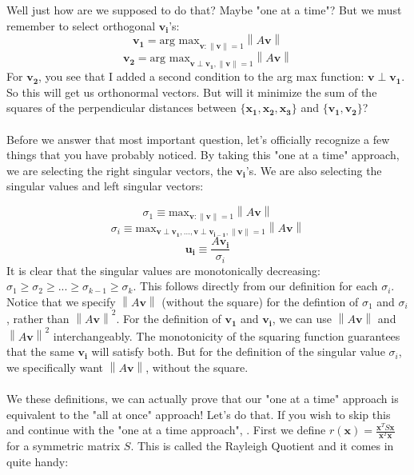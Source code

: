 \documentclass{tufte-handout}
\newcommand{\norm}[1]{\left\lVert#1\right\rVert}
\begin{document}
\noindent Well just how are we supposed to do that? Maybe "one at a time"? But we must remember to select orthogonal $\mathbf{v_i}$'s:
\[
\mathbf{v_1}
=
\text{arg max}_{\mathbf{v}:\norm{\mathbf{v}}=1}\norm{A\mathbf{v}}
\]
\[
\mathbf{v_2}
=
\text{arg max}_{\mathbf{v}\perp\mathbf{v_1},\norm{\mathbf{v}}=1}\norm{A\mathbf{v}}
\]
For $\mathbf{v_2}$, you see that I added a second condition to the arg max function: $\mathbf{v}\perp\mathbf{v_1}$. So this will get us orthonormal vectors. But will it minimize the sum of the squares of the perpendicular distances between $\{\mathbf{x_1},\mathbf{x_2}, \mathbf{x_3}\}$ and $\{\mathbf{v_1}, \mathbf{v_2}\}$?\\\leavevmode\\

\noindent Before we answer that most important question, let's officially recognize a few things that you have probably noticed. By taking this "one at a time" approach, we are selecting the right singular vectors, the $\mathbf{v_i}$'s. We are also selecting the singular values and left singular vectors:

\[
\sigma_{1}\equiv\text{max}_{\mathbf{v}:\norm{\mathbf{v}}=1}\norm{A\mathbf{v}}
\]
\[
\sigma_{i}\equiv\text{max}_{\mathbf{v}\perp\mathbf{v_1},...,\mathbf{v}\perp\mathbf{v_{i-1}},\norm{\mathbf{v}}=1}\norm{A\mathbf{v}}
\]
\[
\mathbf{u_i}\equiv\frac{A\mathbf{v_i}}{\sigma_{i}}
\]
It is clear that the singular values are monotonically decreasing: $\sigma_{1}\geq\sigma_{2}\geq...\geq\sigma_{k-1}\geq\sigma_{k}$. This follows directly from our definition for each $\sigma_{i}$. Notice that we specify $\norm{A\mathbf{v}}$ (without the square) for the defintion of $\sigma_{1}$ and $\sigma_{i}$, rather than $\norm{A\mathbf{v}}^2$. For the definition of $\mathbf{v_1}$ and $\mathbf{v_i}$, we can use $\norm{A\mathbf{v}}$ and $\norm{A\mathbf{v}}^2$ interchangeably. The monotonicity of the squaring function guarantees that the same $\mathbf{v_i}$ will satisfy both. But for the definition of the singular value $\sigma_{i}$, we specifically want $\norm{A\mathbf{v}}$, without the square. \\\leavevmode\\

\noindent We these definitions, we can actually prove that our "one at a time" approach is equivalent to the "all at once" approach! Let's do that. If you wish to skip this and continue with the "one at a time approach", \hyperlink{btoaata}{}. First we define $r(\mathbf{x})=\frac{\mathbf{x}^TS\mathbf{x}}{\mathbf{x}^T\mathbf{x}}$ for a symmetric matrix $S$. This is called the Rayleigh Quotient and it comes in quite handy:\\\leavevmode\\
\end{document}
